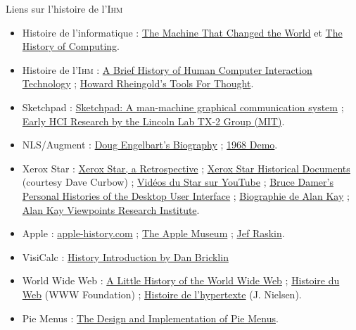 %
\begin{tcbcontents}[top=4pt]{Liens sur l'histoire de l'\textsc{Ihm}}
\setlength{\listindentFB}{0pt}
\begin{itemize}\jazzitem
\item Histoire de l’informatique : 
	\href{http://ei.cs.vt.edu/~history/TMTCTW.html}{The Machine That Changed the World}
	et \href{http://ei.cs.vt.edu/~history/index.html}{The History of Computing}.
\item Histoire de l’\textsc{Ihm} : 
	\href{http://www.cs.cmu.edu/~amulet/papers/uihistory.tr.html}{A Brief History of Human Computer Interaction Technology} ; 
	\href{http://www.rheingold.com/texts/tft/}{Howard Rheingold’s Tools For Thought}.
\item Sketchpad : 
	\href{https://guidebookgallery.org/articles/sketchpadamanmachinegraphicalcommunicationsystem}%
	{Sketchpad: A man-machine graphical communication system}\parnotecusmarkfmt{*} ;
	\href{http://www.billbuxton.com/Lincoln.html}{Early HCI Research by the Lincoln Lab TX-2 Group (MIT)}.
\item NLS/Augment : 
	\href{http://www.dougengelbart.org/content/view/183/153/}{Doug Engelbart’s Biography} ;
	\href{https://web.stanford.edu/dept/SUL/library/extra4/sloan/MouseSite/1968Demo.html}{1968 Demo}.
\item Xerox Star : 
	\href{https://guidebookgallery.org/articles/thexeroxstararetrospective}{Xerox Star, a Retrospective} ; 
	\href{http://www.digibarn.com/friends/curbow/star/index.html}{Xerox Star Historical Documents} (courtesy Dave Curbow) ; 
	\href{https://www.youtube.com/watch?v=8VzT_ANGeP4}{Vidéos du Star sur YouTube} ; 
	\href{http://www.digibarn.com/stories/desktop-history/index.html}{Bruce Damer’s Personal Histories of the Desktop User Interface} ; 
	\href{http://ei.cs.vt.edu/~history/GASCH.KAY.HTML}{Biographie de Alan Kay} ; 
	\href{http://www.vpri.org/html/work/uitald_olpc.htm}{Alan Kay Viewpoints Research Institute}.\parnotecusmarkfmt{*}
\item Apple : 
	\href{https://www.apple-history.com/}{apple-history.com} ; 
	\href{http://applemuseum.bott.org/}{The Apple Museum} ; 
	\href{http://jefraskin.com/}{Jef Raskin}.
\item VisiCalc : 
	\href{http://www.bricklin.com/history/intro.htm}{History Introduction by Dan Bricklin}
\item World Wide Web : 
	\href{https://www.w3.org/History.html}{A Little History of the World Wide Web} ; 
	\href{https://webfoundation.org/about/vision/history-of-the-web/}{Histoire du Web} (WWW Foundation) ; 
	\href{https://www.nngroup.com/articles/hypertext-history/}{Histoire de l’hypertexte} (J. Nielsen).%
\item Pie Menus : 
	\href{http://www.drdobbs.com/database/the-design-and-implementation-of-pie-men/184408667}{The Design and Implementation of Pie Menus}.
\end{itemize}
\parnotes
\end{tcbcontents}
